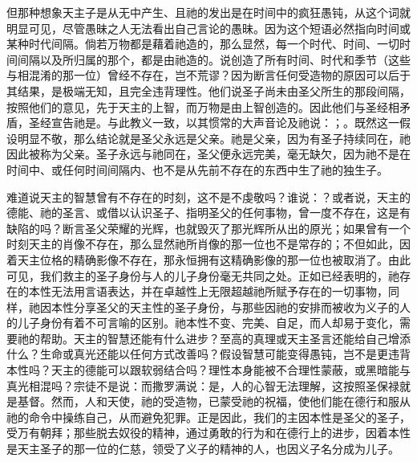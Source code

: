 但那种想象天主子是从无中产生、且祂的发出是在时间中的疯狂愚钝，从这个词就明显可见，尽管愚昧之人无法看出自己言论的愚昧。因为这个短语必然指向时间或某种时代间隔。倘若万物都是藉着祂造的，那么显然，每一个时代、时间、一切时间间隔以及所归属的那个，都是由祂造的。说创造了所有时间、时代和季节（这些与相混淆的那一位）曾经不存在，岂不荒谬？因为断言任何受造物的原因可以后于其结果，是极端无知，且完全违背理性。他们说圣子尚未由圣父所生的那段间隔，按照他们的意见，先于天主的上智，而万物是由上智创造的。因此他们与圣经相矛盾，圣经宣告祂是。与此教义一致，以其惯常的大声音论及祂说：；。既然这一假设明显不敬，那么结论就是圣父永远是父亲。祂是父亲，因为有圣子持续同在，祂因此被称为父亲。圣子永远与祂同在，圣父便永远完美，毫无缺欠，因为祂不是在时间中、或任何时间间隔内、也不是从先前不存在的东西中生了祂的独生子。\par

难道说天主的智慧曾有不存在的时刻，这不是不虔敬吗？谁说：？或者说，天主的德能、祂的圣言、或借以认识圣子、指明圣父的任何事物，曾一度不存在，这是有缺陷的吗？断言圣父荣耀的光辉，也就毁灭了那光辉所从出的原光；如果曾有一个时刻天主的肖像不存在，那么显然祂所肖像的那一位也不是常存的；不但如此，因着天主位格的精确影像不存在，那永恒拥有这精确影像的那一位也被取消了。由此可见，我们救主的圣子身份与人的儿子身份毫无共同之处。正如已经表明的，祂存在的本性无法用言语表达，并在卓越性上无限超越祂所赋予存在的一切事物，同样，祂因本性分享圣父的天主性的圣子身份，与那些因祂的安排而被收为义子的人的儿子身份有着不可言喻的区别。祂本性不变、完美、自足，而人却易于变化，需要祂的帮助。天主的智慧还能有什么进步？至高的真理或天主圣言还能给自己增添什么？生命或真光还能以任何方式改善吗？假设智慧可能变得愚钝，岂不是更违背本性吗？天主的德能可以跟软弱结合吗？理性本身能被不合理性蒙蔽，或黑暗能与真光相混吗？宗徒不是说：而撒罗满说：是，人的心智无法理解，这按照圣保禄就是基督。然而，人和天使，祂的受造物，已蒙受祂的祝福，使他们能在德行和服从祂的命令中操练自己，从而避免犯罪。正是因此，我们的主因本性是圣父的圣子，受万有朝拜；那些脱去奴役的精神，通过勇敢的行为和在德行上的进步，因着本性是天主圣子的那一位的仁慈，领受了义子的精神的人，也因义子名分成为儿子。\par

